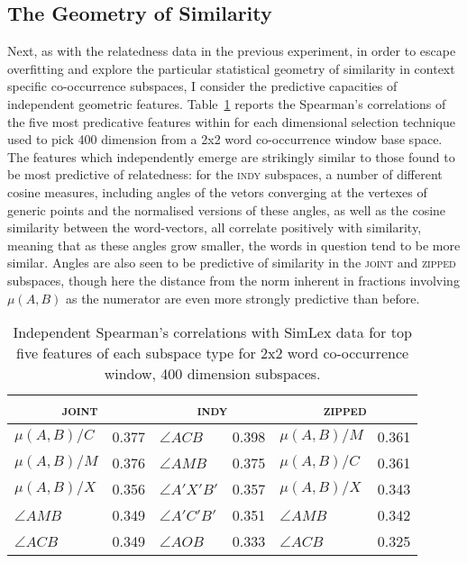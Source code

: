 \subsection{The Geometry of Similarity}
Next, as with the relatedness data in the previous experiment, in order to escape overfitting and explore the particular statistical geometry of similarity in context specific co-occurrence subspaces, I consider the predictive capacities of independent geometric features.  Table~\ref{tab:ind-similar} reports the Spearman's correlations of the five most predicative features within for each dimensional selection technique used to pick 400 dimension from a 2x2 word co-occurrence window base space.  The features which independently emerge are strikingly similar to those found to be most predictive of relatedness: for the \textsc{indy} subspaces, a number of different cosine measures, including angles of the vetors converging at the vertexes of generic points and the normalised versions of these angles, as well as the cosine similarity between the word-vectors, all correlate positively with similarity, meaning that as these angles grow smaller, the words in question tend to be more similar.  Angles are also seen to be predictive of similarity in the \textsc{joint} and \textsc{zipped} subspaces, though here the distance from the norm inherent in fractions involving $\mu(A,B)$ as the numerator are even more strongly predictive than before.

\begin{table}
\centering
\begin{tabular}{lr|lr|lr}
\hline
\multicolumn{2}{c}{\textsc{joint}} & \multicolumn{2}{c}{\textsc{indy}} & \multicolumn{2}{c}{\textsc{zipped}} \\
\hline
$\mu (A,B)/C$ & 0.377 & $\angle ACB$ & 0.398 & $\mu (A,B)/M$ & 0.361 \\
$\mu (A,B)/M$ & 0.376 & $\angle AMB$ & 0.375 & $\mu (A,B)/C$ & 0.361 \\
$\mu (A,B)/X$ & 0.356 & $\angle A'X'B'$ & 0.357 & $\mu (A,B)/X$ & 0.343 \\
$\angle AMB$ & 0.349 & $\angle A'C'B'$ & 0.351 & $\angle AMB$ & 0.342 \\
$\angle ACB$ & 0.349 & $\angle AOB$ & 0.333 & $\angle ACB$ & 0.325 \\
\hline
\end{tabular}
\caption{Independent Spearman's correlations with SimLex data for top five features of each subspace type for 2x2 word co-occurrence window, 400 dimension subspaces.}
\label{tab:ind-similar}
\end{table}

